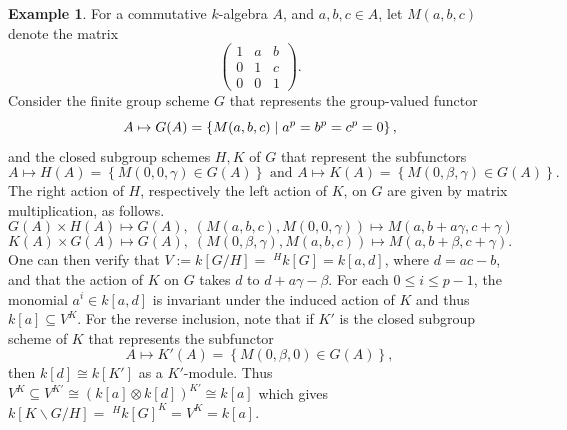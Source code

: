 \documentclass[12pt]{amsart}
\theoremstyle{definition}
\newtheorem{example}[theorem]{Example}
\newcommand{\suchthat}{\;\ifnum\currentgrouptype=16 \middle\fi|\;}
\begin{document}
\begin{example}\label{ex:Mackey}
	For a commutative $k$-algebra $A$, and $ a,b,c\in A$, let $M(a,b,c)$ denote the matrix
	\[
	\begin{pmatrix}
		1 &a & b\\
		0&1&c\\
		0&0&1
	\end{pmatrix}.
	\]
	Consider the finite group scheme $G$ that represents the group-valued functor
	\[
	A\mapsto G(A)=
	\left\{
	M(a,b,c)
	\suchthat a^p=b^p=c^p=0
	\right\},
	\]
	and the closed subgroup schemes $H,K$ of $G$ that represent the subfunctors
	\[
	A\mapsto H(A)
	=
	\left\{
	M(0,0,\gamma)
	\in G(A)
	\right\}
	\text{ and }
	A\mapsto 
	K(A)
	=
	\left\{
	M(0,\beta,\gamma)
	\in G(A)
	\right\}.
	\]
	The right action of $H$, respectively the left action of $K$, on $G$ are given by matrix multiplication, as follows.
	\[
	G(A)\times H(A)\mapsto G(A),\;\left(M(a,b,c),M(0,0,\gamma)\right)\mapsto M(a,b+a\gamma ,c+\gamma)
	\]
	\[
	K(A)\times G(A)\mapsto G(A),\;\left(M(0,\beta ,\gamma),M(a,b,c)\right)\mapsto M(a,b+\beta ,c+\gamma).
	\]
	One can then verify that $V:=k[G/H]=\;^Hk[G]=k[a,d]$, where $d=ac-b$, and that the action of $K$ on $G$ takes $d$ to $d+a\gamma-\beta$. For each $0\leq i\leq p-1$, the monomial $a^i\in k[a,d]$ is invariant under the induced action of $K$ and thus $k[a]\subseteq V^K$. For the reverse inclusion, note that if $K'$ is the closed subgroup scheme of $K$ that represents the subfunctor
	\[
	A\mapsto 
	K'(A)
	=
	\left\{
	M(0,\beta,0)
	\in G(A)
	\right\},
	\]
	then $k[d]\cong k[K']$ as a $K'$-module. Thus $V^{K}\subseteq  V^{K'}\cong (k[a]\otimes k[d])^{K'}\cong k[a]$ which gives $k[K \backslash G / H]=\;^Hk[G]^K= V^K=k[a]$.
	
\end{example}
\end{document}
